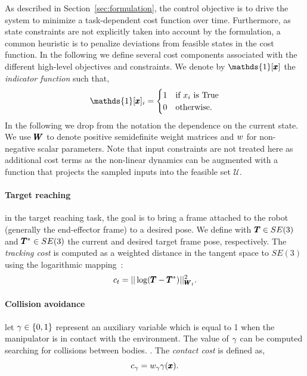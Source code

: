 As described in Section~\ref{sec:formulation}, the control objective is to drive the system to minimize a task-dependent cost function over time. Furthermore, as state constraints are not explicitly taken into account by the formulation, a common heuristic is to penalize deviations from feasible states in the cost function. In the following we define several cost components associated with the different high-level objectives and constraints.
We denote by $\mathds{1}[\vect{x}]$ the \textit{indicator function} such that,
\begin{equation}
    \mathds{1}[\vect{x}]_i = 
    \begin{cases}
    1 & \text{if } x_i \text{ is True} \\
    0 & \text{otherwise}.
    \end{cases}
\end{equation}
In the following we drop from the notation the dependence on the current state. We use $\pmb{W}_{}$ to denote positive semidefinite weight matrices and $w_{}$ for non-negative scalar parameters. Note that input constraints are not treated here as additional cost terms as the non-linear dynamics can be augmented with a function that projects the sampled inputs into the feasible set $\mathcal{U}$.

\paragraph{Target reaching} in the target reaching task, the goal is to bring a frame attached to the robot (generally the end-effector frame) to a desired pose. We define with $\pmb{T} \in SE(3)$ and $\pmb{T}^* \in SE(3)$ the current and desired target frame pose, respectively. The \textit{tracking cost} is computed as a weighted distance in the tangent space to $SE(3)$ using the logarithmic mapping~\cite{blanco2010tutorial}:
\begin{equation} \label{eq:tracking_cost}
     c_{t} = || \log(\pmb{T} - \pmb{T}^{*}) ||^2_{\pmb{W}_{t}}.
 \end{equation}
 
 \paragraph{Collision avoidance} let $\gamma \in \{0, 1\}$ represent an auxiliary variable which is equal to 1 when the manipulator is in contact with the environment. The value of $\gamma$ can be computed searching for collisions between bodies. 
 . 
 The \textit{contact cost} is defined as,
 \begin{equation}
     c_{\gamma}= w_{\gamma} \gamma(\pmb{x}).
 \end{equation}

